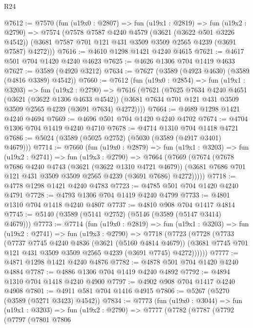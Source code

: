 \begin{lexlean}{R24}
\begin{coremodule}
@7612 := @7570
    (fun (u19x0 : @2807) =>
    fun (u19x1 : @2819) =>
    fun (u19x2 : @2790) =>
    @7574
      (@7578
        @7587
        @4240
        @4579
        (@3621 (@3622 @501 @3226 @4542))
        (@3681 @7587 @701 @121 @431 @3509 @3509 @2565 @4239 (@3691 @7587) @4272)))
@7616 := @4610 @1298 @1421 @4240 @4615
@7621 := @4617 @501 @704 @1420 @4240 @4623
@7625 := @4626 @1306 @704 @1419 @4633
@7627 := @3589 (@4920 @3212)
@7634 := @7627 (@3589 (@4923 @4630) (@3589 (@4816 @3389) @4542))
@7660 := @7612
    (fun (u19x0 : @2854) =>
    fun (u19x1 : @3203) =>
    fun (u19x2 : @2790) =>
    @7616
      (@7621
        (@7625
          @7634
          @4240
          @4651
          (@3621 (@3622 @1306 @4633 @4542))
          (@3681 @7634 @701 @121 @431 @3509 @3509 @2565 @4239 (@3691 @7634) @4272))))
@7664 := @4689 @1298 @1421 @4240 @4694
@7669 := @4696 @501 @704 @1420 @4240 @4702
@7674 := @4704 @1306 @704 @1419 @4240 @4710
@7678 := @4714 @1310 @704 @1418 @4721
@7686 := @5024 (@3589 (@5025 @2752) (@5030 (@3589 (@4917 @3401) @4679)))
@7714 := @7660
    (fun (u19x0 : @2879) =>
    fun (u19x1 : @3203) =>
    fun (u19x2 : @2741) =>
    fun (u19x3 : @2790) =>
    @7664
      (@7669
        (@7674
          (@7678
            @7686
            @4240
            @4743
            (@3621 (@3622 @1310 @4721 @4679))
            (@3681 @7686 @701 @121 @431 @3509 @3509 @2565 @4239 (@3691 @7686) @4272)))))
@7718 := @4778 @1298 @1421 @4240 @4783
@7723 := @4785 @501 @704 @1420 @4240 @4791
@7728 := @4793 @1306 @704 @1419 @4240 @4799
@7733 := @4801 @1310 @704 @1418 @4240 @4807
@7737 := @4810 @908 @704 @1417 @4814
@7745 := @5140 (@3589 (@5141 @2752) (@5146 (@3589 (@5147 @3414) @4679)))
@7773 := @7714
    (fun (u19x0 : @2819) =>
    fun (u19x1 : @3203) =>
    fun (u19x2 : @2741) =>
    fun (u19x3 : @2790) =>
    @7718
      (@7723
        (@7728
          (@7733
            (@7737
              @7745
              @4240
              @4836
              (@3621 (@5160 @4814 @4679))
              (@3681 @7745 @701 @121 @431 @3509 @3509 @2565 @4239 (@3691 @7745) @4272))))))
@7777 := @4871 @1298 @1421 @4240 @4876
@7782 := @4878 @501 @704 @1420 @4240 @4884
@7787 := @4886 @1306 @704 @1419 @4240 @4892
@7792 := @4894 @1310 @704 @1418 @4240 @4900
@7797 := @4902 @908 @704 @1417 @4240 @4908
@7801 := @4911 @581 @704 @1416 @4915
@7806 := @5267 (@5270 (@3589 (@5271 @3423) @4542))
@7834 := @7773
    (fun (u19x0 : @3044) =>
    fun (u19x1 : @3203) =>
    fun (u19x2 : @2790) =>
    @7777
      (@7782
        (@7787
          (@7792
            (@7797
              (@7801
                @7806

\end{coremodule}
\end{lexlean}
